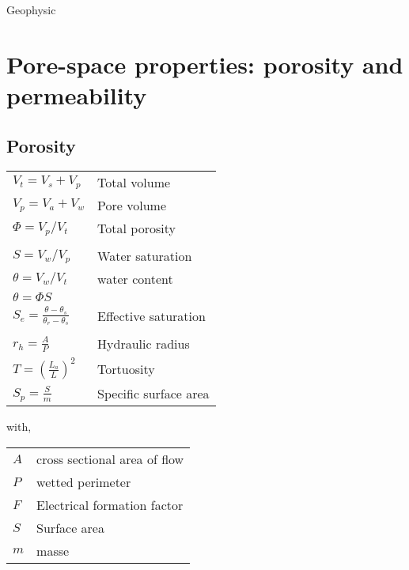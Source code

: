 \documentclass[twocolumn]{article}
\begin{document}
\begin{center}
     \Large{Geophysic} \\
\end{center}










\section{Pore-space properties: porosity and permeability}

\subsection{Porosity}
\begin{tabular}{@{}ll@{}}
$ V_t=V_s+V_p$ & Total volume\\
$ V_p=V_a+V_w$ & Pore volume\\
$ \Phi={V_p}/{V_t}$   & Total porosity \\
\\
$ S={V_w}/{V_p}$ & Water saturation\\
$ \theta ={V_w}/{V_t}$ & water content\\
$\theta=\Phi S$ &\\
$ S_e = \frac{\theta -\theta_s}{\theta_r-\theta_s}$ & Effective saturation\\
\\
$ r_h=\frac{A}{P} $  & Hydraulic radius \\
$ T= \left(\frac{L_a}{L}\right)^2 $ & Tortuosity \\
$ S_p= \frac{S}{m}$ & Specific surface area\\
\end{tabular}
with,
\begin{tabular}{@{}ll@{}}
$A$    & cross sectional area of flow  \\
$P$    & wetted perimeter \\
$F$ 	& Electrical formation factor\\
$S$ & Surface area\\
$m$ & masse\\
\end{tabular}
\end{document}
